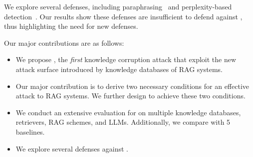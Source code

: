 \noindent
{} We explore several defenses, including paraphrasing~\cite{jain2023baseline} and perplexity-based detection~\cite{jain2023baseline, alon2023detecting, gonen2022demystifying}. Our results show these defenses are insufficient to defend against {\name}, thus 
highlighting the need for new defenses. 

Our major contributions are as follows:
\begin{itemize}
\vspace{-1mm}
    \item We propose {\name}, the \emph{first} knowledge corruption attack that exploit the new attack surface introduced by knowledge databases of RAG systems. 
    \vspace{-1mm}
    \item 
    Our major contribution is to derive two necessary conditions for an effective attack to RAG systems. We further design {\name} to achieve these two conditions.
    \vspace{-1mm}
    \item We conduct an extensive evaluation for {\name} on multiple knowledge databases, retrievers, RAG schemes, and LLMs. Additionally, we compare {\name} with 5 baselines. 
    \vspace{-1mm}
    \item We explore several defenses against {\name}. 
\end{itemize}

